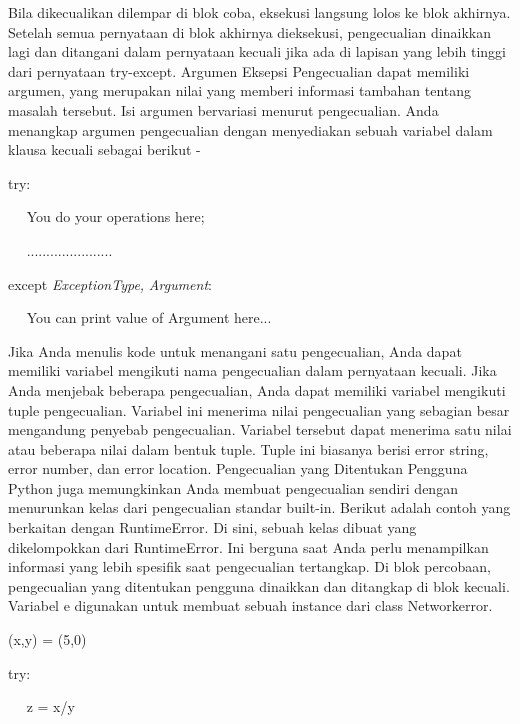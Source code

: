 \noindent 
 \hspace*{0.5in} Bila dikecualikan dilempar di blok coba, eksekusi langsung lolos ke blok akhirnya. Setelah semua pernyataan di blok akhirnya dieksekusi, pengecualian dinaikkan lagi dan ditangani dalam pernyataan kecuali jika ada di lapisan yang lebih tinggi dari pernyataan try-except. Argumen Eksepsi Pengecualian dapat memiliki argumen, yang merupakan nilai yang memberi informasi tambahan tentang masalah tersebut. Isi argumen bervariasi menurut pengecualian. Anda menangkap argumen pengecualian dengan menyediakan sebuah variabel dalam klausa kecuali sebagai berikut - \par
\vspace{12pt}
\noindent 
try: \par
\noindent 
~~ You do your operations here; \par
\noindent 
~~ ...................... \par
\noindent 
except \textit{ExceptionType}\textit{,}\textit{ }\textit{Argument}: \par
\noindent 
~~ You can print value of Argument here... \par
\vspace{12pt}
\noindent 
 \hspace*{0.5in} Jika Anda menulis kode untuk menangani satu pengecualian, Anda dapat memiliki variabel mengikuti nama pengecualian dalam pernyataan kecuali. Jika Anda menjebak beberapa pengecualian, Anda dapat memiliki variabel mengikuti tuple pengecualian. Variabel ini menerima nilai pengecualian yang sebagian besar mengandung penyebab pengecualian. Variabel tersebut dapat menerima satu nilai atau beberapa nilai dalam bentuk tuple. Tuple ini biasanya berisi error string, error number, dan error location. Pengecualian yang Ditentukan Pengguna Python juga memungkinkan Anda membuat pengecualian sendiri dengan menurunkan kelas dari pengecualian standar built-in. Berikut adalah contoh yang berkaitan dengan RuntimeError. Di sini, sebuah kelas dibuat yang dikelompokkan dari RuntimeError. Ini berguna saat Anda perlu menampilkan informasi yang lebih spesifik saat pengecualian tertangkap. Di blok percobaan, pengecualian yang ditentukan pengguna dinaikkan dan ditangkap di blok kecuali. Variabel e digunakan untuk membuat sebuah instance dari class Networkerror. \par
\vspace{12pt}
\noindent 
{\fontsize{10pt}{10pt}\selectfont  (x,y) = (5,0)} \par
\noindent 
{\fontsize{10pt}{10pt}\selectfont  try:} \par
\noindent 
{\fontsize{10pt}{10pt}\selectfont ~~ z = x/y} \par
\noindent 


